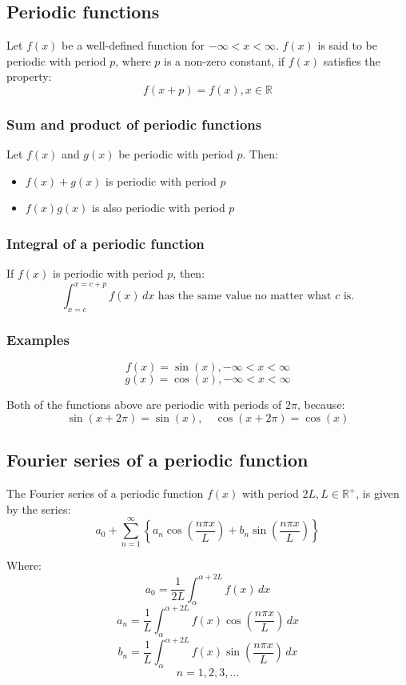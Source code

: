 \documentclass[11pt]{article}
\begin{document}
\subsection{Periodic functions}
\label{sec:org6f13c0a}
Let \(f(x)\) be a well-defined function for \(- \infty < x < \infty\). \(f(x)\) is said to be periodic with period \(p\), where \(p\) is a non-zero constant, if \(f(x)\) satisfies the property:
\[f(x + p) = f(x), x \in \mathbb{R}\]

\subsubsection{Sum and product of periodic functions}
\label{sec:org945980f}
Let \(f(x)\) and \(g(x)\) be periodic with period \(p\). Then:
\begin{itemize}
\item \(f(x) + g(x)\) is periodic with period \(p\)
\item \(f(x) g(x)\) is also periodic with period \(p\)
\end{itemize}

\subsubsection{Integral of a periodic function}
\label{sec:org3975913}
If \(f(x)\) is periodic with period \(p\), then:
\[\int_{x = c}^{x = c + p} f(x) \, dx \text{ has the same value no matter what } c \text{ is.}\]

\subsubsection{Examples}
\label{sec:org5b84eaa}
\[f(x) = \sin (x), - \infty < x < \infty\]
\[g(x) = \cos (x), - \infty < x < \infty\]

Both of the functions above are periodic with periods of \(2 \pi\), because:
\[\sin(x + 2 \pi) = \sin (x), \quad \cos (x + 2 \pi) = \cos (x)\]

\subsection{Fourier series of a periodic function}
\label{sec:orgfb2194c}
The Fourier series of a periodic function \(f(x)\) with period \(2L, L \in \mathbb{R}^+\), is given by the series:
\[a_0 + \sum_{n = 1}^{\infty} \left\{a_n \cos \left( \frac{n \pi x}{L} \right) + b_n \sin \left( \frac{n \pi x}{L} \right) \right\}\]

Where:
\[a_0 = \frac{1}{2L} \int_{\alpha}^{\alpha + 2L} f(x) \, dx\]
\[a_n = \frac{1}{L} \int_{\alpha}^{\alpha + 2L} f(x) \cos \left( \frac{n \pi x}{L} \right) \, dx\]
\[b_n = \frac{1}{L} \int_{\alpha}^{\alpha + 2L} f(x) \sin \left( \frac{n \pi x}{L} \right) \, dx\]
\[n = 1, 2, 3, \ldots\]
\end{document}
